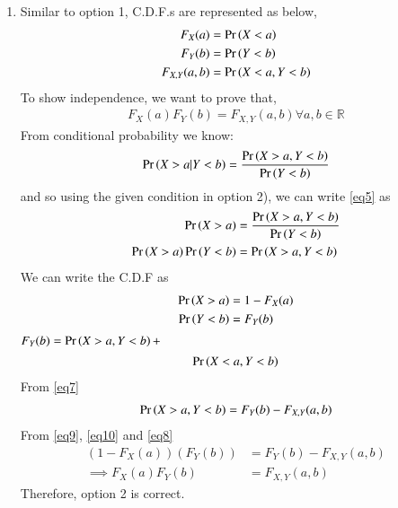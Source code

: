 \documentclass[journal,12pt,twocolumn]{IEEEtran}
\begin{document}
\begin{enumerate}
\item Similar to option 1, C.D.F.s are represented as below,\\
\begin{align}
    F_X(a) &= \Pr\left(X < a\right)\\
    F_Y(b) &= \Pr\left(Y < b\right)\\
    F_{X,Y}(a,b) &= \Pr\left(X < a, Y < b\right)\label{eq7}
\end{align}
To show independence, we want to prove that,
\begin{align}
    F_X(a)F_Y(b) = F_{X, Y}(a,b) \forall a, b \in \mathbb{R}\label{eq5}
\end{align}
From conditional probability we know: 
\begin{align}
    \Pr\left(X > a | Y < b\right) = \frac{\Pr\left(X > a, Y < b\right)}{\Pr\left(Y < b\right)}
\end{align}
and so using the given condition in option 2), we can write \eqref{eq5} as
\begin{align}
    \Pr\left(X > a\right) &= \frac{\Pr\left(X > a, Y < b\right)}{\Pr\left(Y < b\right)}\\
    \Pr\left(X > a\right)\Pr\left(Y < b\right) &= \Pr\left(X > a, Y < b\right)\label{eq6}
\end{align}
We can write the C.D.F as 
\begin{align}
    \Pr\left(X > a\right) &= 1 - F_X(a)\label{eq9}\\
    \Pr\left(Y < b\right) &= F_Y(b)\label{eq10}\\
\end{align}
\begin{math}
    F_Y(b) = \Pr\left(X > a, Y < b\right) +
\end{math}
\begin{align}
    \Pr\left(X < a, Y < b\right)
\end{align}
From \eqref{eq7}
\begin{align}
    \Pr\left(X > a, Y < b\right) = F_Y(b) - F_{X, Y}(a,b)\label{eq8}
\end{align}
From \eqref{eq9}, \eqref{eq10} and \eqref{eq8}
\begin{align}
    (1 - F_X(a))(F_Y(b)) &= F_Y(b) - F_{X, Y}(a,b)\\
    \implies F_X(a)F_Y(b) &= F_{X, Y}(a,b)
\end{align}
Therefore, option 2 is correct.


\end{enumerate}
\end{document}
